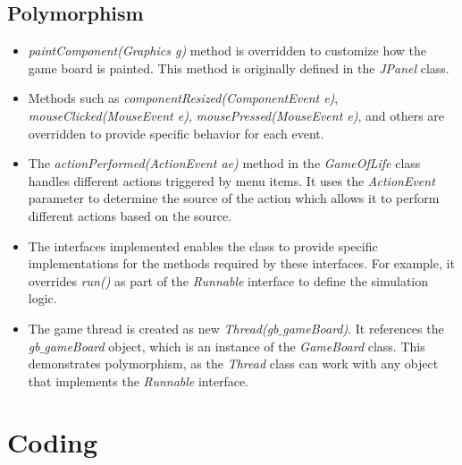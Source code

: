 \documentclass[12pt]{article}
\begin{document}
  \subsection*{Polymorphism}
  \begin{itemize}
    \item \textit{paintComponent(Graphics g)} method is overridden to customize how the game board is painted. This method is originally defined in the \textit{JPanel} class.
    \item Methods such as \textit{componentResized(ComponentEvent e)}, \textit{mouseClicked(MouseEvent e)}, \textit{mousePressed(MouseEvent e)}, and others are overridden to provide specific behavior for each event.
    \item The \textit{actionPerformed(ActionEvent ae)} method in the \textit{GameOfLife} class handles different actions triggered by menu items. It uses the \textit{ActionEvent} parameter to determine the source of the action which allows it to perform different actions based on the source.
    \item The interfaces implemented enables the class to provide specific implementations for the methods required by these interfaces. For example, it overrides \textit{run()} as part of the \textit{Runnable} interface to define the simulation logic.
    \item The game thread is created as new \textit{Thread(gb$\_$gameBoard)}. It references the \textit{gb$\_$gameBoard} object, which is an instance of the \textit{GameBoard} class. This demonstrates polymorphism, as the \textit{Thread} class can work with any object that implements the \textit{Runnable} interface.
  \end{itemize}

  \section*{Coding}
\end{document}
